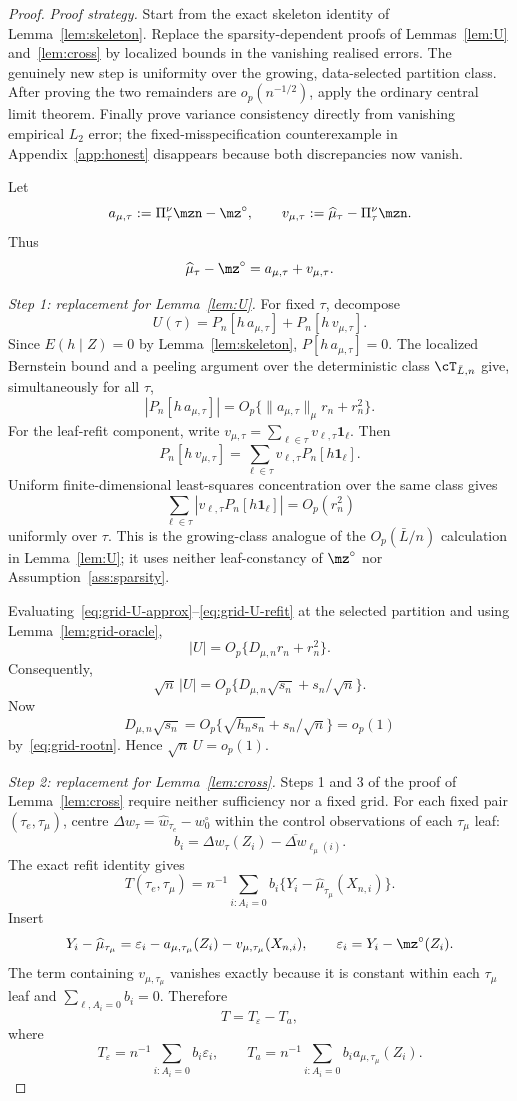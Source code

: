 \begin{proof}
\emph{Proof strategy.}
Start from the exact skeleton identity of Lemma~\ref{lem:skeleton}.  Replace
the sparsity-dependent proofs of Lemmas~\ref{lem:U} and~\ref{lem:cross} by
localized bounds in the vanishing realised errors.  The genuinely new step is
uniformity over the growing, data-selected partition class.  After proving
the two remainders are $o_p(n^{-1/2})$, apply the ordinary central limit
theorem.  Finally prove variance consistency directly from vanishing
empirical $L_2$ error; the fixed-misspecification counterexample in
Appendix~\ref{app:honest} disappears because both discrepancies now vanish.

Let
\[
 a_{\mu,\tau}
   :=\Pi^\nu_\tau\mzn-\mz^\circ,
 \qquad
 v_{\mu,\tau}
   :=\widehat\mu_\tau-\Pi^\nu_\tau\mzn.
\]
Thus
\[
 \widehat\mu_\tau-\mz^\circ=a_{\mu,\tau}+v_{\mu,\tau}.
\]

\emph{Step 1: replacement for Lemma~\ref{lem:U}.}
For fixed $\tau$, decompose
\[
 U(\tau)
 =P_n[h\,a_{\mu,\tau}]
  +P_n[h\,v_{\mu,\tau}].
\]
Since $E(h\mid Z)=0$ by Lemma~\ref{lem:skeleton},
$P[h\,a_{\mu,\tau}]=0$.  The localized Bernstein bound and a peeling argument
over the deterministic class $\cT_{\bar L,n}$ give, simultaneously for all
$\tau$,
\[
 |P_n[h\,a_{\mu,\tau}]|
 =O_p\{\|a_{\mu,\tau}\|_\mu r_n+r_n^2\}.
 \label{eq:grid-U-approx}
\]
For the leaf-refit component, write
$v_{\mu,\tau}=\sum_{\ell\in\tau}v_{\ell,\tau}\mathbf1_\ell$.  Then
\[
 P_n[h\,v_{\mu,\tau}]
 =\sum_{\ell\in\tau}
   v_{\ell,\tau}P_n[h\mathbf1_\ell].
\]
Uniform finite-dimensional least-squares concentration over the same class
gives
\[
 \sum_{\ell\in\tau}
 |v_{\ell,\tau}P_n[h\mathbf1_\ell]|
 =O_p(r_n^2)
 \label{eq:grid-U-refit}
\]
uniformly over $\tau$.  This is the growing-class analogue of the
$O_p(\bar L/n)$ calculation in Lemma~\ref{lem:U}; it uses neither
leaf-constancy of $\mz^\circ$ nor Assumption~\ref{ass:sparsity}.

Evaluating~\eqref{eq:grid-U-approx}--\eqref{eq:grid-U-refit} at the selected
partition and using Lemma~\ref{lem:grid-oracle},
\[
 |U|
 =O_p\{D_{\mu,n}r_n+r_n^2\}.
\]
Consequently,
\[
 \sqrt n\,|U|
 =O_p\{D_{\mu,n}\sqrt{s_n}+s_n/\sqrt n\}.
\]
Now
\[
 D_{\mu,n}\sqrt{s_n}
 =O_p\{\sqrt{h_ns_n}+s_n/\sqrt n\}=o_p(1)
\]
by~\eqref{eq:grid-rootn}.  Hence $\sqrt n\,U=o_p(1)$.

\emph{Step 2: replacement for Lemma~\ref{lem:cross}.}
Steps 1 and 3 of the proof of Lemma~\ref{lem:cross} require neither
sufficiency nor a fixed grid.  For each fixed pair
$(\tau_e,\tau_\mu)$, centre
$\Delta w_\tau=\widehat w_{\tau_e}-w_0^\circ$ within the control observations
of each $\tau_\mu$ leaf:
\[
 b_i=\Delta w_\tau(Z_i)
 -\overline{\Delta w}_{\ell_\mu(i)}.
\]
The exact refit identity gives
\[
 T(\tau_e,\tau_\mu)
 =n^{-1}\sum_{i:A_i=0}b_i\{Y_i-\widehat\mu_{\tau_\mu}(X_{n,i})\}.
\]
Insert
\[
 Y_i-\widehat\mu_{\tau_\mu}
 =\varepsilon_i-a_{\mu,\tau_\mu}(Z_i)-v_{\mu,\tau_\mu}(X_{n,i}),
 \qquad
 \varepsilon_i=Y_i-\mz^\circ(Z_i).
\]
The term containing $v_{\mu,\tau_\mu}$ vanishes exactly because it is constant
within each $\tau_\mu$ leaf and $\sum_{\ell,A_i=0}b_i=0$.  Therefore
\[
 T=T_\varepsilon-T_a,
\]
where
\[
 T_\varepsilon=n^{-1}\sum_{i:A_i=0}b_i\varepsilon_i,
 \qquad
 T_a=n^{-1}\sum_{i:A_i=0}b_i a_{\mu,\tau_\mu}(Z_i).
\]


\end{proof}
